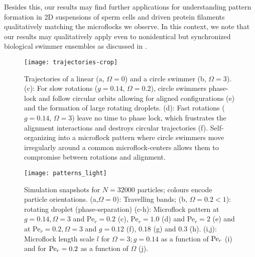 \documentclass[aps,twocolumn,showlabels,showrefs,amsmath,amssymb,pre,superscriptaddress, floatfix, colors]{revtex4}
\newcommand{\1}{\begin{equation}}
\newcommand{\2}{\end{equation}}
\newcommand{\4}[2]{{\frac{#1}{#2}}}
\begin{document}
Besides this, our results may find further applications for understanding pattern formation in 2D suspensions of sperm cells \cite{Riedel2005}
and driven protein filaments \cite{Loose2013, Denk2016} qualitatively matching the microflocks we observe.
In this context, we note that our results may qualitatively apply even to nonidentical but synchronized biological swimmer ensembles as discussed in \cite{Liebchen2016}.


\begin{figure}
\begin{center}
\texttt{[image: trajectories-crop]}
\caption{\small {Trajectories of a linear (a, $\Omega=0$) and a circle swimmer (b, $\Omega=3$). 
(c): For slow rotations ($g=0.14$, $\Omega=0.2$), circle swimmers phase-lock and follow circular orbits allowing for 
aligned configurations (e) and the formation of large rotating droplets.
(d): Fast rotations ($g=0.14$, $\Omega=3$) leave no time to phase lock, which frustrates the alignment interactions and destroys circular trajectories (f).
Self-organizing into a microflock pattern where circle swimmers move irregularly around a common microflock-centers allows them to
compromise between rotations and alignment.}}
\label{cartoon}
\end{center}
\end{figure}


\begin{figure*}
\begin{center}
\texttt{[image: patterns\_light]}
\end{center}
\caption{\small
Simulation snapshots for $N=32000$ particles; colours encode particle orientations.
(a,$\Omega=0$): Travelling bands; (b, $\Omega=0.2<1$): rotating droplet (phase-separation) 
(c-h): Microflock pattern at $g=0.14, \Omega=3$ and Pe$_r=0.2$ (c), 
Pe$_r=1.0$ (d) and  Pe$_r=2$ (e) and at Pe$_r=0.2, \Omega=3$ and $g=0.12$ (f), $0.18$ (g) and $0.3$ (h). 
(i,j): Microflock length scale $l$ for $\Omega=3; g=0.14$ as a function of ${\rm Pe}_r$ (i) and for ${\rm Pe}_r=0.2$ as a function of $\Omega$ (j).} 
\label{fig:pattern}
\end{figure*}
\end{document}
